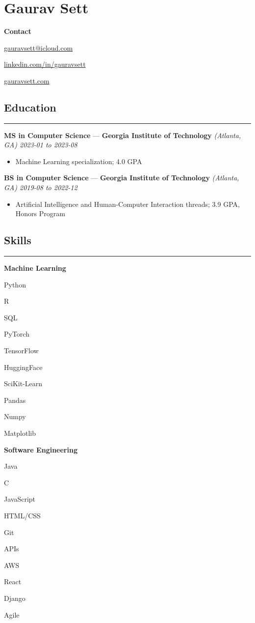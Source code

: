 \documentclass[10pt]{article}
\newcommand{\resumeHeading}[1]{
    \subsection*{#1}
    \hrule
    \vspace*{5pt}
}
\newcommand{\resumeSubHeading}[5]{
    \vspace*{5pt}
    \textbf{#1} — \textbf{#2} \textsl{(#3) \hfill #4 to #5}
}
\newcommand{\resumeListHeading}[1]{\vspace*{5pt}\textbf{#1}}
\begin{document}
\section*{Gaurav Sett}

\textbf{Contact}
\begin{itemize*}[label=$|$]
    \item \href{mailto:gauravsett@icloud.com}{gauravsett@icloud.com}
    \item \href{https://linkedin.com/in/gauravsett}{linkedin.com/in/gauravsett}
    \item \href{https://gauravsett.com}{gauravsett.com}
\end{itemize*}



\resumeHeading{Education}

\resumeSubHeading
    {MS in Computer Science}
    {Georgia Institute of Technology}
    {Atlanta, GA}
    {2023-01}
    {2023-08}
\begin{itemize}
    \item Machine Learning specialization; 4.0 GPA
\end{itemize}

\resumeSubHeading
    {BS in Computer Science}
    {Georgia Institute of Technology}
    {Atlanta, GA}
    {2019-08}
    {2022-12}
\begin{itemize}
    \item Artificial Intelligence and Human-Computer Interaction threads; 3.9 GPA, Honors Program
\end{itemize}



\resumeHeading{Skills}

\resumeListHeading{Machine Learning}
\begin{itemize*}[label=$|$]
    \item Python
    \item R
    \item SQL
    \item PyTorch
    \item TensorFlow
    \item HuggingFace
    \item SciKit-Learn
    \item Pandas
    \item Numpy
    \item Matplotlib
\end{itemize*}

\resumeListHeading{Software Engineering}
\begin{itemize*}[label=$|$]
    \item Java
    \item C
    \item JavaScript 
    \item HTML/CSS 
    \item Git
    \item APIs
    \item AWS
    \item React
    \item Django
    \item Agile
\end{itemize*}
\end{document}
